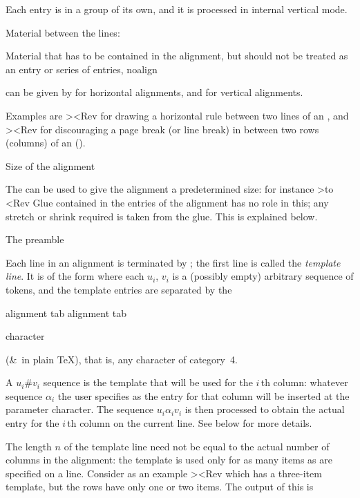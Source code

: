 Each entry is in a group of its own, and it is processed
in internal vertical mode.

\spoint Material between the lines: 

Material that has to be contained in the alignment, but 
should not be treated as an entry or series of entries,
\csterm noalign\par
can be given by 
\disp{}\lb{}\rb
\dispstop for horizontal alignments, and
\disp{}\lb{}\rb
\dispstop for vertical alignments.

Examples are
\Ver>\noalign{\hrule}<Rev for drawing a horizontal rule
between two lines of an ,
and \Ver><Rev
for discouraging a page break (or line break) in
between two rows (columns) of an  ().

\spoint Size of the alignment

The  can be used to give the alignment
a predetermined size: for instance
\Ver>\halign to <Rev
Glue contained in the entries of the alignment has no role in this;
any stretch or
shrink required is taken from the  glue.
This is explained below.

\point The preamble

Each line in an alignment is terminated by ;
the first line is called the {\it template line}.
It is of the form
\disp{}\dispstop
where each $u_i$, $v_i$ is a (possibly empty) arbitrary sequence
of tokens, and the template entries are separated by
the {\italic alignment tab 
\term alignment tab\par
character} (\n\&~in plain \TeX),
that is, any character of category~4. 

A $u_i$\n\#$v_i$ sequence is the template that will be
used for the $i\,$th column: whatever sequence $\alpha_i$
the user specifies
as the entry for that column will be inserted at the
parameter character. The sequence $u_i\alpha_iv_i$ is
then processed to obtain the actual entry for the $i\,$th
column on the current line. See below for more details.

The length $n$ of the template line need
not be equal to the actual number of columns in the alignment:
the template is used only for as many items as are specified
on a line. Consider as an example
\Ver><Rev
which has a three-item template, but the rows have only
one or two items. The output of this is
\disp\leavevmode\vbox{}\dispstop

